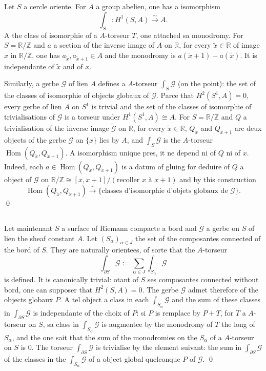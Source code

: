 \documentclass[12pt,a4paper]{article}
\theoremstyle{plain}
\theoremstyle{definition}
\theoremstyle{remark}
\DeclareMathOperator{\Hom}{Hom}
\newcommand{\Z}{\mathbb{Z}}
\newcommand{\R}{\mathbb{R}}
\providecommand{\Hom}{\operatorname{Hom}}
\providecommand{\R}{\mathrm{R}}
\begin{document}
\subsection{}

Let $S$ a cercle oriente. For $A$ a group abelien, one has a isomorphism
\[
\int_S : H^1(S, A) \xrightarrow{\sim} A.
\]
A the class of isomorphie of a $A$-torseur $T$, one attached sa monodromy. For $S = \R/\Z$ and
$a$ a section of the inverse image of $A$ on $\R$, for every $\tilde{x} \in \R$ of image $x$ in $\R/\Z$,
one has $a_{\tilde{x}}, a_{\tilde{x}+1} \in A$ and the monodromy is $a(\tilde{x} + 1) - a(\tilde{x})$. It is independante of $\tilde{x}$
and of $x$.

Similarly, a gerbe $\mathscr{G}$ of lien $A$ defines a $A$-torseur $\int_S \mathscr{G}$ (on the point): the set
of the classes of isomorphie of objects globaux of $\mathscr{G}$. Parce that $H^2(S^1, A) = 0$, every gerbe
of lien $A$ on $S^1$ is trivial and the set of the classes of isomorphie of trivialisations of $\mathscr{G}$
is a torseur under $H^1(S^1, A) \cong A$. For $S = \R/\Z$ and $Q$ a trivialisation of the inverse image $\tilde{\mathscr{G}}$ on $\R$, for every $\tilde{x} \in \R$, $Q_{\tilde{x}}$ and $Q_{\tilde{x}+1}$ are deux objects of the gerbe $\mathscr{G}$ on
$\{x\}$ lies by $A$, and $\int_S \mathscr{G}$ is the $A$-torseur $\Hom(Q_{\tilde{x}}, Q_{\tilde{x}+1})$. A isomorphism unique pres,
it ne depend ni of $Q$ ni of $x$. Indeed, each $a \in \Hom(Q_{\tilde{x}}, Q_{\tilde{x}+1})$ is a datum of
gluing for deduire of $Q$ a object of $\mathscr{G}$ on $\R/\Z \cong [x, x+1]/(\text{recoller } x \text{ à } x+1)$
and by this construction
\[
\Hom(Q_{\tilde{x}}, Q_{\tilde{x}+1}) \xrightarrow{\sim} \{\text{classes d'isomorphie d'objets globaux de } \mathscr{G}\}.
\]
\qed

\subsection{}

Let maintenant $S$ a surface of Riemann compacte a bord and $\mathscr{G}$ a gerbe
on $S$ of lien the sheaf constant $A$. Let $(S_\alpha)_{\alpha \in J}$ the set of the composantes connected
of the bord of $S$. They are naturally orientees, of sorte that the $A$-torseur
\[
\int_{\partial S} \mathscr{G} := \sum_{\alpha \in J} \int_{S_\alpha} \mathscr{G}
\]
is defined. It is canonically trivial: otant of $S$ ses composantes connected without bord,
one can supposer that $H^2(S, A) = 0$. The gerbe $\mathscr{G}$ admet therefore of the objects globaux $P$. A
tel object a class in each $\int_{S_\alpha} \mathscr{G}$ and the sum of these classes in $\int_{\partial S} \mathscr{G}$ is
independante of the choix of $P$: si $P$ is remplace by $P + T$, for $T$ a $A$-torseur on $S$,
sa class in $\int_{S_\alpha} \mathscr{G}$ is augmentee by the monodromy of $T$ the long of $S_\alpha$, and the one sait
that the sum of the monodromies on the $S_\alpha$ of a $A$-torseur on $S$ is $0$. The torseur $\int_{\partial S} \mathscr{G}$
is trivialise by the element suivant: the sum in $\int_{\partial S} \mathscr{G}$ of the classes in the $\int_{S_\alpha} \mathscr{G}$
of a object global quelconque $P$ of $\mathscr{G}$.
\qed
\end{document}
